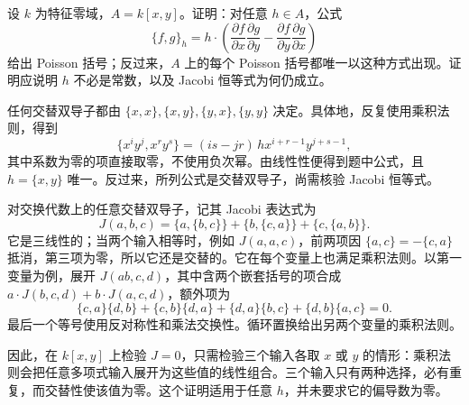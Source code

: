 \begin{exercise}\label{b4:ex:poisson-plane-polynomial}
	设 \(k\) 为特征零域，\(A=k[x,y]\)。证明：对任意 \(h\in A\)，公式
	\[
		\{f,g\}_h=h\cdot\left(
		\frac{\partial f}{\partial x}\frac{\partial g}{\partial y}
		-\frac{\partial f}{\partial y}\frac{\partial g}{\partial x}
		\right)
	\]
	给出 Poisson 括号；反过来，\(A\) 上的每个 Poisson 括号都唯一以这种方式出现。证明应说明 \(h\) 不必是常数，以及 Jacobi 恒等式为何仍成立。
\end{exercise}
\begin{solution}
	任何交替双导子都由 \(\{x,x\},\{x,y\},\{y,x\},\{y,y\}\) 决定。具体地，反复使用乘积法则，得到
	\[
		\{x^i y^j,x^r y^s\}
		=(is-jr)\,h x^{i+r-1}y^{j+s-1},
	\]
	其中系数为零的项直接取零，不使用负次幂。由线性性便得到题中公式，且 \(h=\{x,y\}\) 唯一。反过来，所列公式是交替双导子，尚需核验 Jacobi 恒等式。

	对交换代数上的任意交替双导子，记其 Jacobi 表达式为
	\[
		J(a,b,c)=\{a,\{b,c\}\}+\{b,\{c,a\}\}+\{c,\{a,b\}\}.
	\]
	它是三线性的；当两个输入相等时，例如 \(J(a,a,c)\)，前两项因 \(\{a,c\}=-\{c,a\}\) 抵消，第三项为零，所以它还是交替的。它在每个变量上也满足乘积法则。以第一变量为例，展开 \(J(ab,c,d)\)，其中含两个嵌套括号的项合成 \(a\cdot J(b,c,d)+b\cdot J(a,c,d)\)，额外项为
	\[
		\{c,a\}\{d,b\}+\{c,b\}\{d,a\}
		+\{d,a\}\{b,c\}+\{d,b\}\{a,c\}=0.
	\]
	最后一个等号使用反对称性和乘法交换性。循环置换给出另两个变量的乘积法则。

	因此，在 \(k[x,y]\) 上检验 \(J=0\)，只需检验三个输入各取 \(x\) 或 \(y\) 的情形：乘积法则会把任意多项式输入展开为这些值的线性组合。三个输入只有两种选择，必有重复，而交替性使该值为零。这个证明适用于任意 \(h\)，并未要求它的偏导数为零。
\end{solution}

